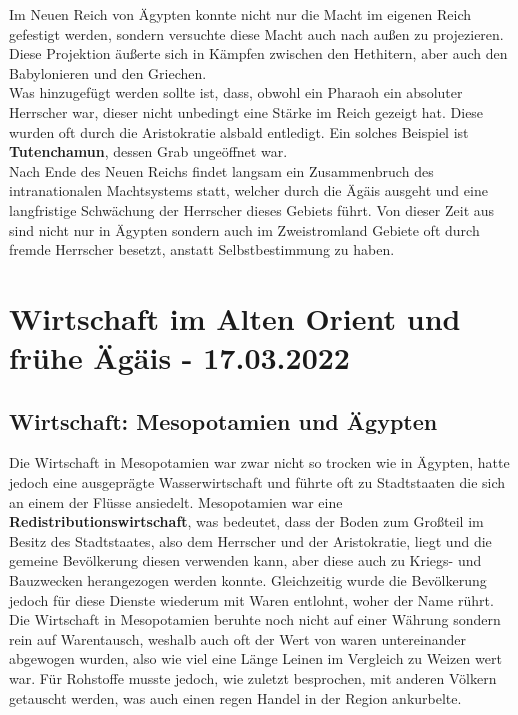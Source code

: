 \documentclass{article}
\begin{document}
	Im Neuen Reich von Ägypten konnte nicht nur die Macht im eigenen Reich gefestigt werden, sondern versuchte diese Macht auch nach außen zu projezieren. Diese Projektion äußerte sich in Kämpfen zwischen den Hethitern, aber auch den Babylonieren und den Griechen. \\
	Was hinzugefügt werden sollte ist, dass, obwohl ein Pharaoh ein absoluter Herrscher war, dieser nicht unbedingt eine Stärke im Reich gezeigt hat. Diese wurden oft durch die Aristokratie alsbald entledigt. Ein solches Beispiel ist \textbf{Tutenchamun}, dessen Grab ungeöffnet war. \\
	Nach Ende des Neuen Reichs findet langsam ein Zusammenbruch des intranationalen Machtsystems statt, welcher durch die Ägäis ausgeht und eine langfristige Schwächung der Herrscher dieses Gebiets führt. Von dieser Zeit aus sind nicht nur in Ägypten sondern auch im Zweistromland Gebiete oft durch fremde Herrscher besetzt, anstatt Selbstbestimmung zu haben.

	\section{Wirtschaft im Alten Orient und frühe Ägäis - 17.03.2022}
	\subsection{Wirtschaft: Mesopotamien und Ägypten}

	Die Wirtschaft in Mesopotamien war zwar nicht so trocken wie in Ägypten, hatte jedoch eine ausgeprägte Wasserwirtschaft und führte oft zu Stadtstaaten die sich an einem der Flüsse ansiedelt. Mesopotamien war eine \textbf{Redistributionswirtschaft}, was bedeutet, dass der Boden zum Großteil im Besitz des Stadtstaates, also dem Herrscher und der Aristokratie, liegt und die gemeine Bevölkerung diesen verwenden kann, aber diese auch zu Kriegs- und Bauzwecken herangezogen werden konnte. Gleichzeitig wurde die Bevölkerung jedoch für diese Dienste wiederum mit Waren entlohnt, woher der Name rührt. \\
	
	Die Wirtschaft in Mesopotamien beruhte noch nicht auf einer Währung sondern rein auf Warentausch, weshalb auch oft der Wert von waren untereinander abgewogen wurden, also wie viel eine Länge Leinen im Vergleich zu Weizen wert war. Für Rohstoffe musste jedoch, wie zuletzt besprochen, mit anderen Völkern getauscht werden, was auch einen regen Handel in der Region ankurbelte. \\ \\
	
\end{document}
